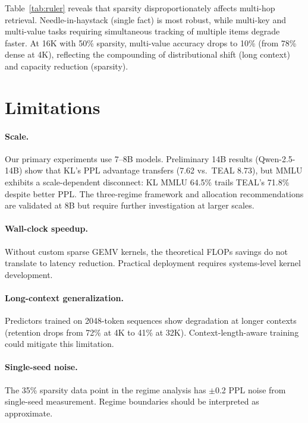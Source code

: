 \documentclass[11pt,a4paper]{article}
\begin{document}
Table~\ref{tab:ruler} reveals that sparsity disproportionately affects multi-hop retrieval. Needle-in-haystack (single fact) is most robust, while multi-key and multi-value tasks requiring simultaneous tracking of multiple items degrade faster. At 16K with 50\% sparsity, multi-value accuracy drops to 10\% (from 78\% dense at 4K), reflecting the compounding of distributional shift (long context) and capacity reduction (sparsity).

\section{Limitations}

\paragraph{Scale.} Our primary experiments use 7--8B models. Preliminary 14B results (Qwen-2.5-14B) show that KL's PPL advantage transfers (7.62 vs.\ TEAL 8.73), but MMLU exhibits a scale-dependent disconnect: KL MMLU 64.5\% trails TEAL's 71.8\% despite better PPL. The three-regime framework and allocation recommendations are validated at 8B but require further investigation at larger scales.

\paragraph{Wall-clock speedup.} Without custom sparse GEMV kernels, the theoretical FLOPs savings do not translate to latency reduction. Practical deployment requires systems-level kernel development.

\paragraph{Long-context generalization.} Predictors trained on 2048-token sequences show degradation at longer contexts (retention drops from 72\% at 4K to 41\% at 32K). Context-length-aware training could mitigate this limitation.

\paragraph{Single-seed noise.} The 35\% sparsity data point in the regime analysis has $\pm$0.2 PPL noise from single-seed measurement. Regime boundaries should be interpreted as approximate.
\end{document}

